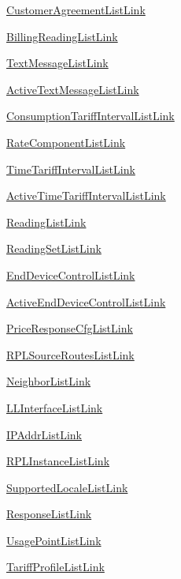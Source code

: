 \begin{DoxyCompactItemize}
\item 
\hyperlink{group__CustomerAgreementListLink}{Customer\+Agreement\+List\+Link}
\item 
\hyperlink{group__BillingReadingListLink}{Billing\+Reading\+List\+Link}
\item 
\hyperlink{group__TextMessageListLink}{Text\+Message\+List\+Link}
\item 
\hyperlink{group__ActiveTextMessageListLink}{Active\+Text\+Message\+List\+Link}
\item 
\hyperlink{group__ConsumptionTariffIntervalListLink}{Consumption\+Tariff\+Interval\+List\+Link}
\item 
\hyperlink{group__RateComponentListLink}{Rate\+Component\+List\+Link}
\item 
\hyperlink{group__TimeTariffIntervalListLink}{Time\+Tariff\+Interval\+List\+Link}
\item 
\hyperlink{group__ActiveTimeTariffIntervalListLink}{Active\+Time\+Tariff\+Interval\+List\+Link}
\item 
\hyperlink{group__ReadingListLink}{Reading\+List\+Link}
\item 
\hyperlink{group__ReadingSetListLink}{Reading\+Set\+List\+Link}
\item 
\hyperlink{group__EndDeviceControlListLink}{End\+Device\+Control\+List\+Link}
\item 
\hyperlink{group__ActiveEndDeviceControlListLink}{Active\+End\+Device\+Control\+List\+Link}
\item 
\hyperlink{group__PriceResponseCfgListLink}{Price\+Response\+Cfg\+List\+Link}
\item 
\hyperlink{group__RPLSourceRoutesListLink}{R\+P\+L\+Source\+Routes\+List\+Link}
\item 
\hyperlink{group__NeighborListLink}{Neighbor\+List\+Link}
\item 
\hyperlink{group__LLInterfaceListLink}{L\+L\+Interface\+List\+Link}
\item 
\hyperlink{group__IPAddrListLink}{I\+P\+Addr\+List\+Link}
\item 
\hyperlink{group__RPLInstanceListLink}{R\+P\+L\+Instance\+List\+Link}
\item 
\hyperlink{group__SupportedLocaleListLink}{Supported\+Locale\+List\+Link}
\item 
\hyperlink{group__ResponseListLink}{Response\+List\+Link}
\item 
\hyperlink{group__UsagePointListLink}{Usage\+Point\+List\+Link}
\item 
\hyperlink{group__TariffProfileListLink}{Tariff\+Profile\+List\+Link}

\end{DoxyCompactItemize}
